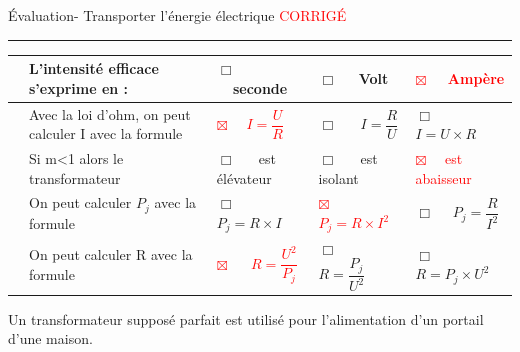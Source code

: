 \documentclass[11pt,a4paper]{article}
\begin{document}
\noindent

\begin{center}
\LARGE{Évaluation- Transporter l'énergie électrique}
\Large{\textcolor{red}{CORRIGÉ}}\\[3mm]
\end{center}
\normalsize
\hrule 


\vspace {8 mm}




    \begin{tabular}{p{2mm} p{5.5cm}|C{3cm}|C{3cm}|C{3cm}}
    

         & L'intensité efficace s'exprime en :& $\Box $ ~~seconde & $\Box $ ~~Volt  & \textcolor{red}{$\boxtimes $ ~~Ampère} \\
         \hline
       & Avec la loi d'ohm, on peut calculer I avec la formule   & \textcolor{red}{$\boxtimes $ ~~$I=\dfrac{U}{R}$}   & $\Box $ ~~ $I = \dfrac{R}{U}$ & $\Box $ ~~$I=U \times R$\\
        \hline
          & Si m<1 alors le transformateur  &$\Box $ ~~ est élévateur  &$\Box $ ~~ est isolant  & \textcolor{red}{$\boxtimes $ ~~est abaisseur}  \\
         \hline
          &On peut calculer $P_j$ avec la formule  &$\Box $ ~~ $P_j=R \times I$  &\textcolor{red}{$\boxtimes $ ~~ $P_j=R \times I^2$}  & $\Box $ ~~$P_j=\dfrac{R}{I^2}$  \\

         \hline
         
         & On peut calculer R avec la formule &\textcolor{red}{$\boxtimes $ ~~ $R=\dfrac{U^2}{P_j}$}  &$\Box $ ~~ $R= \dfrac{P_j}{U^2}$  & $\Box $ ~~ $R=P_j \times U^2$  \\

 
        
         \end{tabular}
\vspace{3mm}

Un transformateur supposé parfait est utilisé pour l'alimentation d'un portail  d'une maison. 
\end{document}
